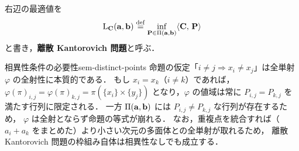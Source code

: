 右辺の最適値を
\[
  \mathrm{L}_{\mathbf{C}}(\mathbf{a}, \mathbf{b})
  \overset{\mathrm{def}}{=} \inf_{\mathbf{P} \in \Pi(\mathbf{a}, \mathbf{b})} \langle \mathbf{C},\, \mathbf{P} \rangle
\]
と書き，\textbf{離散 Kantorovich 問題}と呼ぶ．

\begin{remark}{相異性条件の必要性}{sem-distinct-points}
  命題の仮定「$i \neq j \Rightarrow x_i \neq x_j$」は全単射 $\varphi$ の全射性に本質的である．
  もし $x_i = x_k$（$i \neq k$）であれば，$\varphi(\pi)_{i,j} = \varphi(\pi)_{k,j} = \pi(\{x_i\} \times \{y_j\})$
  となり，$\varphi$ の値域は常に $P_{i,j} = P_{k,j}$ を満たす行列に限定される．
  一方 $\Pi(\mathbf{a}, \mathbf{b})$ には $P_{i,j} \neq P_{k,j}$ な行列が存在するため，
  $\varphi$ は全射とならず命題の等式が崩れる．
  なお，重複点を統合すれば（$a_i + a_k$ をまとめた）より小さい次元の多面体との全単射が取れるため，
  離散 Kantorovich 問題の枠組み自体は相異性なしでも成立する．
\end{remark}

